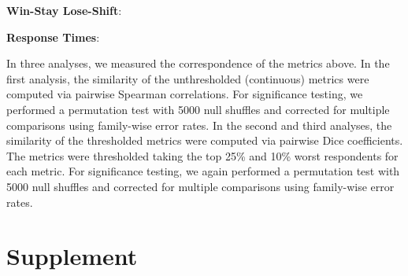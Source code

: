 \documentclass[a4paper,notitlepage,12pt]{article}
\begin{document}
\textbf{Win-Stay Lose-Shift}: 

\textbf{Response Times}:

In three analyses, we measured the correspondence of the metrics above. In the first analysis, the similarity of the unthresholded (continuous) metrics were computed via pairwise Spearman correlations. For significance testing, we performed a permutation test with 5000 null shuffles and corrected for multiple comparisons using family-wise error rates. In the second and third analyses, the similarity of the thresholded metrics were computed via pairwise Dice coefficients. The metrics were thresholded taking the top 25\% and 10\% worst respondents for each metric. For significance testing, we again performed a permutation test with 5000 null shuffles and corrected for multiple comparisons using family-wise error rates.

\pagebreak
\section{Supplement}
\end{document}
